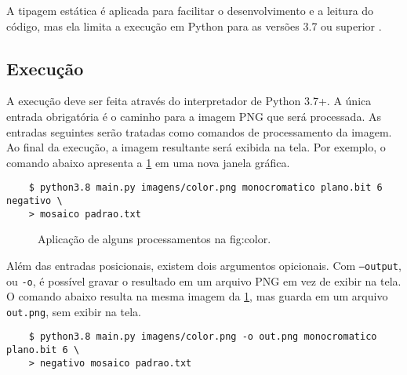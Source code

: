 A tipagem estática é aplicada para facilitar o desenvolvimento e a leitura do código, mas ela limita a execução em Python para as versões 3.7 ou superior \autocite{ref:pep563}.


\subsection{Execução}

A execução deve ser feita através do interpretador de Python 3.7+. A única entrada obrigatória é o caminho para a imagem PNG que será processada. As entradas seguintes serão tratadas como comandos de processamento da imagem. Ao final da execução, a imagem resultante será exibida na tela. Por exemplo, o comando abaixo apresenta a \cref{fig:execucao} em uma nova janela gráfica.

\begin{verbatim}
    $ python3.8 main.py imagens/color.png monocromatico plano.bit 6 negativo \
    > mosaico padrao.txt
\end{verbatim}

\begin{figure}[H]
    \centering

    \caption{Aplicação de alguns processamentos na fig:color.}
    \label{fig:execucao}
\end{figure}

Além das entradas posicionais, existem dois argumentos opicionais. Com \texttt{--output}, ou \texttt{-o}, é possível gravar o resultado em um arquivo PNG em vez de exibir na tela. O comando abaixo resulta na mesma imagem da \cref{fig:execucao}, mas guarda em um arquivo \texttt{out.png}, sem exibir na tela.

\begin{verbatim}
    $ python3.8 main.py imagens/color.png -o out.png monocromatico plano.bit 6 \
    > negativo mosaico padrao.txt
\end{verbatim}

